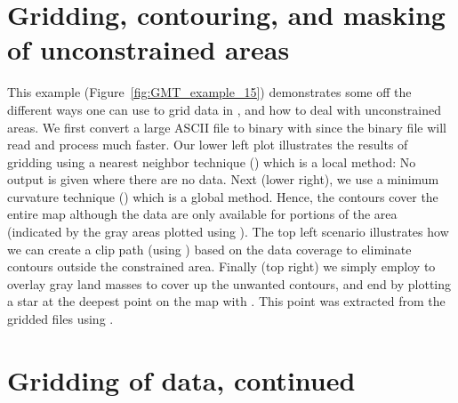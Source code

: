 

\section{Gridding, contouring, and masking of unconstrained areas}

This example (Figure~\ref{fig:GMT_example_15}) demonstrates
some off the different ways one
can use to grid data in \GMT, and how to deal with unconstrained
areas.  We first convert a large ASCII file to binary with
 since the binary file will read and process
much faster.  Our lower left plot illustrates the results of
gridding using a nearest neighbor technique ()
which is a local method: No output is given where there are no data.
Next (lower right), we use a minimum curvature technique
() which is a global method.  Hence, the contours
cover the entire map although the data are only available for
portions of the area (indicated by the gray areas plotted using
).  The top left scenario illustrates how we can
create a clip path (using ) based on the data coverage
to eliminate contours outside the constrained area.
Finally (top right) we simply employ  to overlay
gray land masses to cover up the unwanted contours, and end by
plotting a star at the deepest point on the map with .
This point was extracted from the gridded files using .



\section{Gridding of data, continued}

